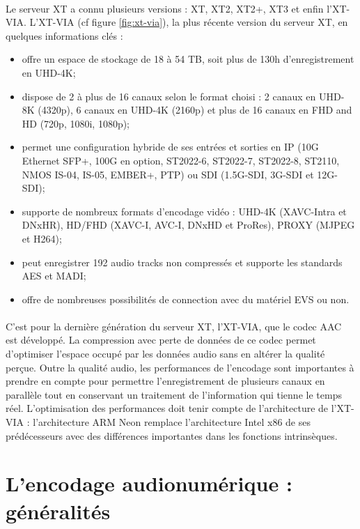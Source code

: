\documentclass{article}
\begin{document}
    \paragraph{}
    Le serveur XT a connu plusieurs versions : XT, XT2, XT2+, XT3 et enfin l'XT-VIA. L'XT-VIA (cf figure \ref{fig:xt-via}), la plus récente version du serveur XT, en quelques informations clés\cite{EVS:products} :
    \begin{itemize}
        \item offre un espace de stockage de 18 à 54 TB, soit plus de 130h d'enregistrement en UHD-4K;
        \item dispose de 2 à plus de 16 canaux selon le format choisi : 2 canaux en UHD-8K (4320p), 6 canaux en UHD-4K (2160p) et plus de 16 canaux en FHD and HD (720p, 1080i, 1080p);
        \item permet une configuration hybride de ses entrées et sorties en IP (10G Ethernet SFP+, 100G en option, ST2022-6, ST2022-7, ST2022-8, ST2110, NMOS IS-04, IS-05, EMBER+, PTP) ou SDI (1.5G-SDI, 3G-SDI et 12G-SDI);
        \item supporte de nombreux formats d'encodage vidéo : UHD-4K (XAVC-Intra et DNxHR), HD/FHD (XAVC-I, AVC-I, DNxHD et ProRes), PROXY (MJPEG et H264);
        \item peut enregistrer 192 audio tracks non compressés et supporte les standards AES et MADI;
        \item offre de nombreuses possibilités de connection avec du matériel EVS ou non.
    \end{itemize}

    \paragraph{}
    C'est pour la dernière génération du serveur XT, l'XT-VIA, que le codec AAC est développé. La compression avec perte de données de ce codec permet d'optimiser l'espace occupé par les données audio sans en altérer la qualité perçue. Outre la qualité audio, les performances de l'encodage sont importantes à prendre en compte pour permettre l'enregistrement de plusieurs canaux en parallèle tout en conservant un traitement de l'information qui tienne le temps réel. L'optimisation des performances doit tenir compte de l'architecture de l'XT-VIA : l'architecture ARM Neon remplace l'architecture Intel x86 de ses prédécesseurs avec des différences importantes dans les fonctions intrinsèques.


    \newpage
    \section{L'encodage audionumérique : généralités}
\end{document}
